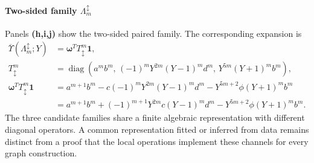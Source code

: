\paragraph{Two-sided family $\Lambda_m^{\updownarrow}$}
\label{supp:transfer_two_sided}
Panels \textbf{(h,i,j)} show the two-sided paired family. The corresponding expansion is
\begin{equation}
\begin{aligned}
\overline{\Upsilon}(\Lambda_m^{\updownarrow};Y)&=\bm\omega^TT_\updownarrow^m\bm1,\\
T_\updownarrow^m&=\operatorname{diag}\!\left(a^mb^m,\,(-1)^mY^{2m}(Y-1)^md^m,\,Y^{5m}(Y+1)^mb^m\right),\\
\bm\omega^TT_\updownarrow^m\bm1
&=a^{m+1}b^m-c(-1)^mY^{2m}(Y-1)^md^m-Y^{5m+2}\phi(Y+1)^mb^m\\
&=\boxed{a^{m+1}b^m+(-1)^{m+1}Y^{2m}c(Y-1)^md^m-Y^{5m+2}\phi(Y+1)^mb^m}.
\end{aligned}
\label{supp:deriv:eq:updown_family}
\end{equation}
The three candidate families share a finite algebraic representation with different diagonal operators. A common representation fitted or inferred from data remains distinct from a proof that the local operations implement these channels for every graph construction.

